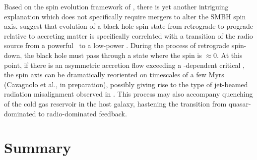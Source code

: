 \documentclass[useAMS,usenatbib]{mn2e}
\begin{document}
Based on the spin evolution framework of \citet{gesspin}, there is yet
another intriguing explanation which does not specifically require
mergers to alter the SMBH spin axis. \citet{gesspin} suggest that
evolution of a black hole spin state from retrograde to prograde
relative to accreting matter is specifically correlated with a
transition of the radio source from a powerful \frii\ to a low-power
\fri. During the process of retrograde spin-down, the black hole must
pass through a state where the spin is $\approx 0$. At this point, if
there is an asymmetric accretion flow exceeding a \mbh-dependent
critical \dmacc, the spin axis can be dramatically reoriented on
timescales of a few Myrs (Cavagnolo et al., in preparation), possibly
giving rise to the type of jet-beamed radiation misalignment observed
in \irs. This process may also accompany quenching of the cold gas
reservoir in the host galaxy, hastening the transition from
quasar-dominated to radio-dominated feedback.

\section{Summary}
\label{sec:summ}
\end{document}
